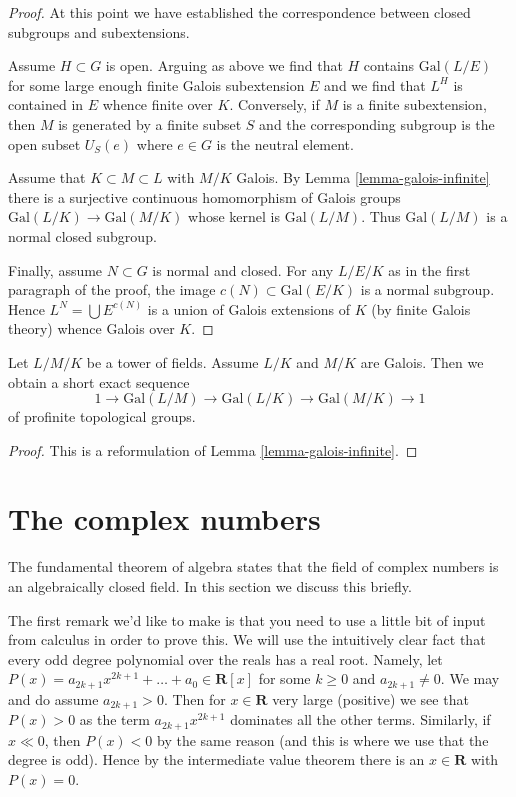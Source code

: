 \begin{proof}
\medskip\noindent
At this point we have established the correspondence between closed
subgroups and subextensions.

\medskip\noindent
Assume $H \subset G$ is open. Arguing as above we find that
$H$ contains $\text{Gal}(L/E)$ for some large enough finite
Galois subextension $E$ and we find that $L^H$ is contained
in $E$ whence finite over $K$. Conversely, if $M$ is a finite
subextension, then $M$ is generated by a finite subset $S$
and the corresponding subgroup is the open subset $U_S(e)$
where $e \in G$ is the neutral element.

\medskip\noindent
Assume that $K \subset M \subset L$ with $M/K$ Galois.
By Lemma \ref{lemma-galois-infinite} there is a surjective
continuous homomorphism of Galois groups
$\text{Gal}(L/K) \to \text{Gal}(M/K)$ whose
kernel is $\text{Gal}(L/M)$. Thus $\text{Gal}(L/M)$ is a normal
closed subgroup.

\medskip\noindent
Finally, assume $N \subset G$ is normal and closed. For any
$L/E/K$ as in the first paragraph of the proof, the image
$c(N) \subset \text{Gal}(E/K)$ is a normal subgroup.
Hence $L^N = \bigcup E^{c(N)}$ is a union of Galois extensions
of $K$ (by finite Galois theory) whence Galois over $K$.
\end{proof}

\begin{lemma}
\label{lemma-ses-infinite-galois}
Let $L/M/K$ be a tower of fields. Assume $L/K$ and $M/K$ are Galois.
Then we obtain a short exact sequence
$$
1 \to \text{Gal}(L/M) \to \text{Gal}(L/K) \to \text{Gal}(M/K) \to 1
$$
of profinite topological groups.
\end{lemma}

\begin{proof}
This is a reformulation of Lemma \ref{lemma-galois-infinite}.
\end{proof}






\section{The complex numbers}
\label{section-complex-numbers}

\noindent
The fundamental theorem of algebra states that the field of complex numbers
is an algebraically closed field. In this section we discuss this
briefly.

\medskip\noindent
The first remark we'd like to make is that you need to use a little
bit of input from calculus in order to prove this. We will use the
intuitively clear fact that every odd degree polynomial over
the reals has a real root. Namely, let
$P(x) = a_{2k + 1} x^{2k + 1} + \ldots + a_0 \in \mathbf{R}[x]$
for some $k \geq 0$ and $a_{2k + 1} \not = 0$.
We may and do assume $a_{2k + 1} > 0$. Then for $x \in \mathbf{R}$
very large (positive) we see that $P(x) > 0$ as the term
$a_{2k + 1} x^{2k + 1}$ dominates all the other terms. Similarly,
if $x \ll 0$, then $P(x) < 0$ by the same reason (and this is where
we use that the degree is odd). Hence by the intermediate value
theorem there is an $x \in \mathbf{R}$ with $P(x) = 0$.

